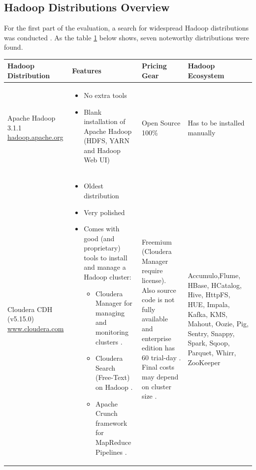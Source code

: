 \documentclass[12pt]{article}
\begin{document}
\subsection{Hadoop Distributions Overview}\label{hd}
For the first part of the evaluation, a search for widespread Hadoop distributions was conducted \citep{hadoopvendors,forrester,comparison2014,Cloudera,M.Heo2015}.
As the table \ref{tab:distributions} below shows, seven noteworthy distributions were found.
\begin{table}[H]
\hspace{-3.3cm}
\begin{tabular}{|p{4.4cm}|p{6.2cm}|p{4cm}|p{4cm}|}
	\hline
	\textbf{Hadoop \newline Distribution} & \textbf{Features} & \textbf{ Pricing Gear}  & \textbf{ Hadoop \newline Ecosystem}\\ \hline
	Apache Hadoop 3.1.1
\href{http://hadoop.apache.org/}{hadoop.apache.org} & 
\begin{itemize}[noitemsep,leftmargin=*]
   \item No extra tools
   \item Blank installation of Apache Hadoop (HDFS, YARN and Hadoop Web UI)
\end{itemize}
& Open Source 100\% & Has to be
installed
manually \citep{apachehadoop}\\ \hline
Cloudera CDH (v5.15.0)
\href{https://www.cloudera.com/}{www.cloudera.com} & \begin{itemize}[noitemsep,leftmargin=*]
   \item Oldest distribution
   \item Very polished
   \item Comes with good (and proprietary)
tools to install and manage a Hadoop
cluster: \begin{itemize}
\item Cloudera Manager for managing
and monitoring clusters \citep{Cloudera2018a}.
\item Cloudera Search (Free-Text) on
Hadoop \citep{Cloudera2018}.
\item Apache Crunch framework for
MapReduce Pipelines \citep{Cloudera2018}.
\end{itemize}
\end{itemize} &Freemium (Cloudera Manager require license). Also source code is not fully available and enterprise edition has 60 trial-day \citep{D.Kumar2016}. Final costs may depend on cluster size \citep{Cloudera}.  &Accumulo,Flume, HBase, HCatalog, Hive, HttpFS, HUE, Impala, Kafka, KMS, Mahout, Oozie, Pig, Sentry, Snappy, Spark, Sqoop, Parquet, Whirr, ZooKeeper \citep{Cloudera2018a,Cloudera2018}\\ \hline
\end{tabular}
\label{tab:distributions}
\end{table}
\end{document}

